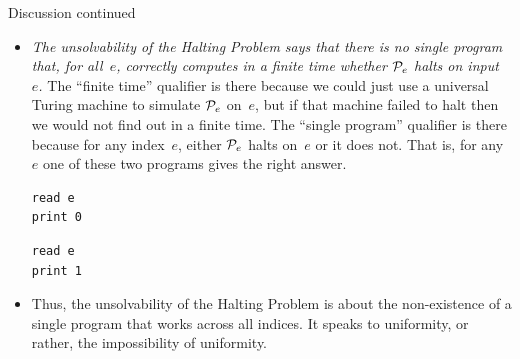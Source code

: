 \documentclass[9pt,t,serif,professionalfont,xcolor={table,dvipsnames},noamsthm]{beamer}
\begin{document}
\begin{frame}[fragile]{Discussion continued}
\begin{itemize}
\item \textit{The unsolvability of the Halting Problem 
  says that there is no single program that, for all~$e$, correctly computes 
  in a finite time whether $\mathcal{P}_e$ halts on input~$e$.}
  The ``finite time'' qualifier is there because we could just use a universal
  Turing machine to simulate $\mathcal{P}_e$ on~$e$, but if that machine failed to halt
  then we would not find out in a finite time. 
  The ``single program'' qualifier is there because for any index~$e$,
  either $\mathcal{P}_e$ halts on~$e$ or it does not.
  That is, for any~$e$ one of these two programs
  gives the right answer.
\begin{center}
\vspace*{-\ht\strutbox}
\begin{minipage}[t]{0.4\linewidth}%
\begin{lstlisting}
read e
print 0
\end{lstlisting}%
\end{minipage}%
\hspace*{2em plus 0.5fil}
\begin{minipage}[t]{0.4\linewidth}%
\begin{lstlisting}
read e
print 1
\end{lstlisting}%
\end{minipage}%
\end{center}

\item
Thus, the unsolvability of the Halting Problem is about 
the non-existence of a single program that works across all
indices.
It speaks to uniformity,
or rather, the impossibility of uniformity.
\end{itemize}
\end{frame}
\end{document}
